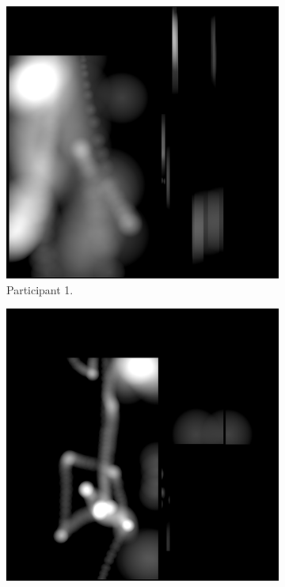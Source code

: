 \begin{figure}[!ht]\centering
    \begin{subfigure}[b]{0.24\textwidth}
        \centering
        \includegraphics[width=\textwidth]{img/data/Panel17/single/1.png}
        \caption{Participant 1.}
    \end{subfigure}
    \hfill
    \begin{subfigure}[b]{0.24\textwidth}
        \centering
        \includegraphics[width=\textwidth]{img/data/Panel17/single/2.png}

\end{subfigure}
\end{figure}
